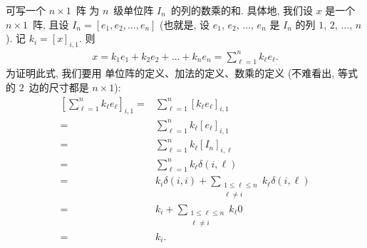 \documentclass[../libro.tex]{subfiles}
\begin{document}
可写一个 \(n \times 1\)~阵%
为 \(n\)~级单位阵 \(I_n\)~的列的数乘的和.
具体地, 我们设 \(x\) 是一个 \(n \times 1\)~阵,
且设 \(I_n = [e_1, e_2, \dots, e_n]\)
(也就是, %
设 \(e_1\), \(e_2\), \(\dots\), \(e_n\) 是
\(I_n\) 的列 \(1\), \(2\), \(\dots\), \(n\)). %
记 \(k_i = [x]_{i,1}\).
则
\begin{align*}
    x
    =
    k_1 e_1 + k_2 e_2 + \dots + k_n e_n
    =
    \sum_{\ell = 1}^{n} {k_\ell e_\ell}.
\end{align*}
为证明此式, 我们要用%
单位阵的定义、加法的定义、数乘的定义
(不难看出, 等式的 \(2\)~边的尺寸都是 \(n \times 1\)):
\begin{align*}
    \left[ \sum_{\ell = 1}^{n} {k_\ell e_\ell} \right]_{i,1}
    = {} &
    \sum_{\ell = 1}^{n} {[k_\ell e_\ell]_{i,1}}
    \\
    = {} &
    \sum_{\ell = 1}^{n} {k_\ell [e_\ell]_{i,1}}
    \\
    = {} &
    \sum_{\ell = 1}^{n} {k_\ell [I_n]_{i,\ell}}
    \\
    = {} &
    \sum_{\ell = 1}^{n} {k_\ell \delta(i, \ell)}
    \\
    = {} &
    k_i \delta(i, i)
    + \sum_{\substack{1 \leq \ell \leq n \\ \ell \neq i}}
    {k_\ell \delta(i, \ell)}
    \\
    = {} &
    k_i
    + \sum_{\substack{1 \leq \ell \leq n \\ \ell \neq i}}
    {k_\ell 0}
    \\
    = {} &
    k_i.
\end{align*}
\end{document}
